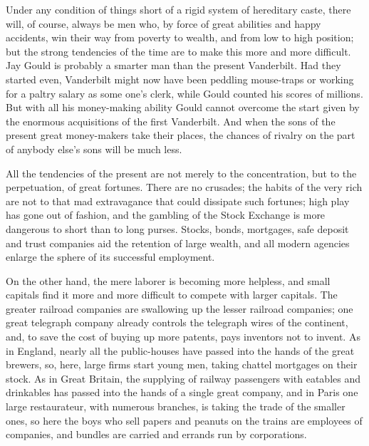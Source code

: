 \documentclass{book}
\begin{document}
Under any condition of things short of a rigid system of hereditary caste, there will, of course, always be men who, by force of great abilities and happy accidents, win their way from poverty to wealth, and from low to high position; but the strong tendencies of the time are to make this more and more difficult. Jay Gould is probably a smarter man than the present Vanderbilt. Had they started even, Vanderbilt might now have been peddling mouse-traps or working for a paltry salary as some one’s clerk, while Gould counted his scores of millions. But with all his money-making ability Gould cannot overcome the start given by the enormous acquisitions of the first Vanderbilt. And when the sons of the present great money-makers take their places, the chances of rivalry on the part of anybody else’s sons will be much less.

All the tendencies of the present are not merely to the concentration, but to the perpetuation, of great fortunes. There are no crusades; the habits of the very rich are not to that mad extravagance that could dissipate such fortunes; high play has gone out of fashion, and the gambling of the Stock Exchange is more dangerous to short than to long purses. Stocks, bonds, mortgages, safe deposit and trust companies aid the retention of large wealth, and all modern agencies enlarge the sphere of its successful employment.

On the other hand, the mere laborer is becoming more helpless, and small capitals find it more and more difficult to compete with larger capitals. The greater railroad companies are swallowing up the lesser railroad companies; one great telegraph company already controls the telegraph wires of the continent, and, to save the cost of buying up more patents, pays inventors not to invent. As in England, nearly all the public-houses have passed into the hands of the great brewers, so, here, large firms start young men, taking chattel mortgages on their stock. As in Great Britain, the supplying of railway passengers with eatables and drinkables has passed into the hands of a single great company, and in Paris one large restaurateur, with numerous branches, is taking the trade of the smaller ones, so here the boys who sell papers and peanuts on the trains are employees of companies, and bundles are carried and errands run by corporations.
\end{document}
